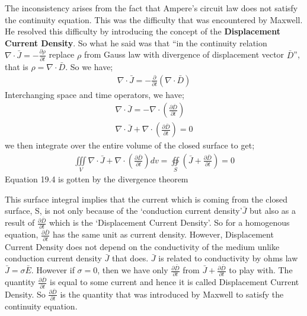 The inconsistency arises from the fact that Ampere's circuit law does not satisfy the continuity equation. This was the difficulty that was encountered by Maxwell. He resolved this difficulty by introducing the concept of the \textbf{Displacement Current Density}. So what he said was that \textquotedblleft in the continuity relation $\nabla\cdot\bar{J}=-\frac{\partial\rho}{\partial t}$ replace $\rho$ from Gauss law with divergence of displacement vector $\bar{D}$\textquotedblright, that is $\rho=\nabla\cdot\bar{D}$. So we have;
\begin{align}
\nabla\cdot\bar{J}=-\frac{\partial}{\partial t}(\nabla\cdot\bar{D})
\end{align}
Interchanging space and time operators, we have;
\begin{align}
\nabla\cdot\bar{J}=-\nabla\cdot(\frac{\partial\bar{D}}{\partial t})\\
\nabla\cdot\bar{J}+\nabla\cdot(\frac{\partial\bar{D}}{\partial t}) = 0
\end{align}
we then integrate over the entire volume of the closed surface to get;
\begin{align}
\iiint\limits_V\nabla\cdot\bar{J}+\nabla\cdot(\frac{\partial\bar{D}}{\partial t})dv=
\oiint\limits_S(\bar{J}+\frac{\partial\bar{D}}{\partial t})=0
\end{align}
Equation 19.4 is gotten by the divergence theorem

This surface integral implies that the current which is coming from the closed surface, S, is not only because of the \textquoteleft conduction current density\textquoteright $\bar{J}$ but also as a result of $\frac{\partial\bar{D}}{\partial t}$ which is the \textquoteleft Displacement Current Density\textquoteright. So for a homogenous equation, $\frac{\partial\bar{D}}{\partial t}$ has the same unit as current density. However, Displacement Current Density does not depend on the conductivity of the medium unlike conduction current density $\bar{J}$ that does. $\bar{J}$ is related to conductivity by ohms law $\bar{J}=\sigma\bar{E}$. However if $\sigma=0$, then we have only $\frac{\partial\bar{D}}{\partial t}$ from $\bar{J}+\frac{\partial\bar{D}}{\partial t}$ to play with. The quantity $\frac{\partial\bar{D}}{\partial t}$ is equal to some current and hence it is called Displacement Current Density. So $\frac{\partial\bar{D}}{\partial t}$ is the quantity that was introduced by Maxwell to satisfy the continuity equation.

